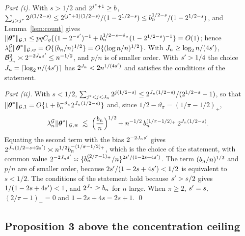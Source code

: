 \emph{Part (i).} With $s > 1/2$ and $2^{j^{*}+1} \ge b$,
$\sum_{j>j^{*}}2^{j(1/2-s)} \le 2^{(j^{*}+1)(1/2-s)}/(1-2^{1/2-s}) \le
b_{n}^{1/2-s}/(1-2^{1/2-s})$, and Lemma~\ref{lem:count} gives
$\lVert \boldsymbol{\theta}^{*}\rVert_{\mathcal{G},1} \le pqC_g\{(1-2^{-s'})^{-1} +
b_{n}^{1/2-s-\vartheta_{\pi}}(1-2^{1/2-s})^{-1}\} = O(1)$; hence
$\lambda^{\mathcal{G}}_{n}\lVert \boldsymbol{\theta}^{*}\rVert_{\mathcal{G},w} = O\{(b_{n}/n)^{1/2}\} = O\{(\log n/n)^{1/2}\}$. With
$J_n \ge \log_2 n/(4s')$, $\mathcal{B}_{J_n}^{2} \asymp 2^{-2J_ns'} \le
n^{-1/2}$, and $p/n$ is of smaller order. With $s' > 1/4$ the choice
$J_n = \lceil\log_2 n/(4s')\rceil$ has $2^{J_n} < 2n^{1/(4s')}$ and
satisfies the conditions of the statement.

\emph{Part (ii).} With $s < 1/2$,
$\sum_{j^{*}<j<J_n}2^{j(1/2-s)} \le 2^{J_n(1/2-s)}/(2^{1/2-s}-1)$, so that
$\lVert \boldsymbol{\theta}^{*}\rVert_{\mathcal{G},1} = O\{1 + b_{n}^{-\vartheta_{\pi}}2^{J_n(1/2-s)}\}$ and, since
$1/2 - \vartheta_{\pi} = (1/\pi-1/2)_{+}$,
\[
  \lambda^{\mathcal{G}}_{n}\lVert \boldsymbol{\theta}^{*}\rVert_{\mathcal{G},w} \;\lesssim\; \Bigl(\frac{b_{n}}{n}\Bigr)^{1/2}
  + n^{-1/2}\,b_{n}^{(1/\pi-1/2)_{+}}\,2^{J_n(1/2-s)} .
\]
Equating the second term with the bias $2^{-2J_ns'}$ gives
$2^{J_n(1/2-s+2s')} \asymp n^{1/2}b_{n}^{-(1/\pi-1/2)_{+}}$, which is the
choice of the statement, with common value $2^{-2J_ns'} \asymp
\{b_{n}^{(2/\pi-1)_{+}}/n\}^{2s'/(1-2s+4s')}$. The term $(b_{n}/n)^{1/2}$ and
$p/n$ are of smaller order, because $2s'/(1-2s+4s') < 1/2$ is equivalent
to $s < 1/2$. The conditions of the statement hold because $s' > s/2$ gives
$1/(1-2s+4s') < 1$, and $2^{J_n} \ge b_{n}$ for $n$ large. When $\pi \ge 2$,
$s' = s$, $(2/\pi-1)_{+} = 0$ and $1-2s+4s = 2s+1$. \qed

\subsection*{Proposition 3 above the concentration ceiling}

